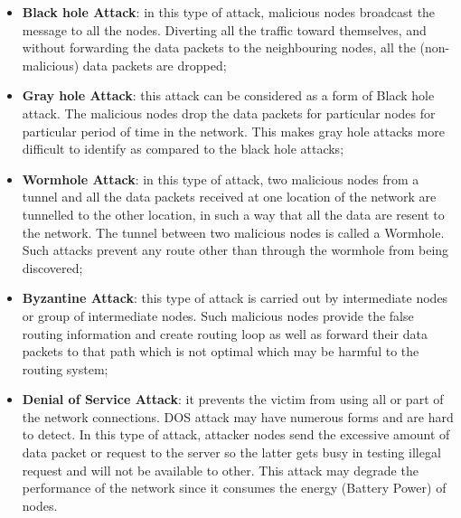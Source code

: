 \documentclass[compsoc, conference, letterpaper, 10pt, times]{IEEEtran}
\begin{document}
\begin{itemize}
\item  \textbf{Black hole Attack}: in this type of attack, malicious nodes broadcast the message to all the nodes.
Diverting all the
traffic toward themselves, and without forwarding the data packets to the neighbouring nodes, all the (non-malicious) data packets
are dropped;

\item \textbf{Gray hole Attack}: this attack can be considered as a form of Black hole attack. The malicious nodes drop the data packets for particular nodes for particular period of time in the network.
This makes gray hole attacks more difficult to identify as compared to the black hole attacks;

\item \textbf{Wormhole Attack}: in this type of attack, two malicious nodes from a tunnel and all the data packets received at
one location of the network are tunnelled to the other location, in such a way that all the data are
resent to the network. The tunnel between two malicious nodes is called a Wormhole. Such attacks prevent any
route other than through the wormhole from being discovered;

\item \textbf{Byzantine Attack}: this type of attack is carried out by intermediate nodes or group of intermediate nodes.
Such malicious nodes provide the false routing information and create routing loop as well as forward their
data packets to that path which is not optimal which may be harmful to the routing system;

\item \textbf{Denial of Service Attack}: it prevents the victim from using all or part of the network connections. DOS attack may have numerous forms and are hard to detect. In this type of attack, attacker nodes send the
excessive amount of data packet or request to the server so the latter gets busy in testing illegal request and will not be available to other. This attack may degrade the performance of the network since it consumes the
energy (Battery Power) of nodes.
\end{itemize}
\end{document}

